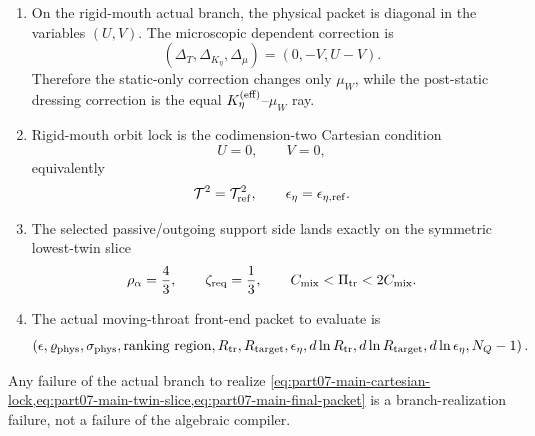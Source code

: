 \begin{theorem}
\begin{enumerate}[leftmargin=2.2em]
\begin{equation}
  \label{eq:part07-main-prefactor-packet}
  \bigl(\Delta_{\rm norm},a_{P_0},b_{P_0}\bigr),
  \qquad
  b_{P_0}=3a_{P_0},
  \qquad
  \Xi_1=\frac{P_1}{P_0}.
  \end{equation}
  The robust one-scalar ceiling is
  \begin{equation}
  \label{eq:part07-main-xi-ceiling}
  \frac{\Delta_{\rm norm}+T_{\rm quad}}{\hat m_0^{\,2}}
  \bigl(1+|\varepsilon\Xi_1|\bigr)
  \le P_{\rm crit},
  \qquad
  T_{\rm quad}:=\frac{54Gc_s^5}{5a^5c^5}.
  \end{equation}
  \item On the rigid-mouth actual branch, the physical packet is diagonal in the variables \((U,V)\).  The microscopic dependent correction is
  \begin{equation}
  \label{eq:part07-main-dependent-correction}
  (\Delta_T,\Delta_{K_\eta},\Delta_\mu)=(0,-V,U-V).
  \end{equation}
  Therefore the static-only correction changes only \(\mu_W\), while the post-static dressing correction is the equal \(K_\eta^{(\rm eff)}\)--\(\mu_W\) ray.
  \item Rigid-mouth orbit lock is the codimension-two Cartesian condition
  \begin{equation}
  \label{eq:part07-main-cartesian-lock}
  U=0,
  \qquad
  V=0,
  \end{equation}
  equivalently
  \begin{equation}
  \label{eq:part07-main-cartesian-lock-physical}
  \mathcal T^2=\mathcal T_{\rm ref}^2,
  \qquad
  \epsilon_\eta=\epsilon_{\eta,\rm ref}.
  \end{equation}
  \item The selected passive/outgoing support side lands exactly on the symmetric lowest-twin slice
  \begin{equation}
  \label{eq:part07-main-twin-slice}
  \rho_\alpha=\frac43,
  \qquad
  \zeta_{\rm req}=\frac13,
  \qquad
  C_{\rm mix}<\Pi_{\rm tr}<2C_{\rm mix}.
  \end{equation}
  \item The actual moving-throat front-end packet to evaluate is
  \begin{equation}
  \label{eq:part07-main-final-packet}
  \left(
  \epsilon,
  \varrho_{\rm phys},
  \sigma_{\rm phys},
  \text{ranking region},
  R_{\rm tr},
  R_{\rm target},
  \epsilon_\eta,
  d\ln R_{\rm tr},
  d\ln R_{\rm target},
  d\ln\epsilon_\eta,
  N_Q-1
  \right).
  \end{equation}
\end{enumerate}
Any failure of the actual branch to realize \cref{eq:part07-main-cartesian-lock,eq:part07-main-twin-slice,eq:part07-main-final-packet} is a branch-realization failure, not a failure of the algebraic compiler.
\end{theorem}


